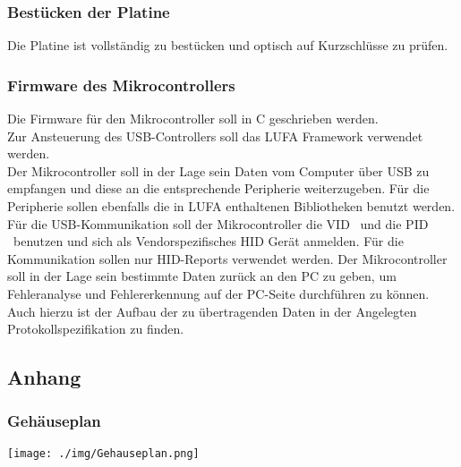 \subsubsection{Bestücken der Platine}

Die Platine ist vollständig zu bestücken und optisch auf Kurzschlüsse zu prüfen.

\subsubsection{Firmware des Mikrocontrollers}

Die Firmware für den Mikrocontroller soll in C geschrieben werden.\\
Zur Ansteuerung des USB-Controllers soll das LUFA Framework verwendet werden.\\
Der Mikrocontroller soll in der Lage sein Daten vom Computer über USB zu empfangen und diese
an die entsprechende Peripherie weiterzugeben. Für die Peripherie sollen ebenfalls die in LUFA enthaltenen Bibliotheken
benutzt werden.\\
Für die USB-Kommunikation soll der Mikrocontroller die VID \VID\ und die PID \PID\ benutzen und sich als Vendorspezifisches HID Gerät anmelden. Für die Kommunikation sollen nur HID-Reports verwendet werden. Der Mikrocontroller soll in der Lage sein bestimmte Daten zurück an den PC zu geben, um Fehleranalyse und Fehlererkennung auf der PC-Seite durchführen zu können.
Auch hierzu ist der Aufbau der zu übertragenden Daten in der Angelegten Protokollspezifikation zu finden.
\pagebreak
\subsection{Anhang}
\subsubsection{Gehäuseplan}
\texttt{[image: ./img/Gehauseplan.png]}